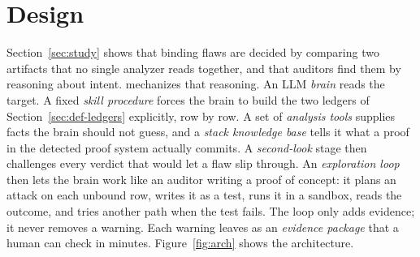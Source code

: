 \section{\tool{} Design}\label{sec:design}

Section~\ref{sec:study} shows that binding flaws are decided by comparing
two artifacts that no single analyzer reads together, and that auditors find
them by reasoning about intent. \tool{} mechanizes that reasoning. An LLM
\emph{brain} reads the target. A fixed \emph{skill procedure} forces the brain
to build the two ledgers of Section~\ref{sec:def-ledgers} explicitly, row by
row. A set of \emph{analysis tools} supplies facts the brain should not guess,
and a \emph{stack knowledge base} tells it what a proof in the detected proof
system actually commits. A \emph{second-look} stage then challenges every
verdict that would let a flaw slip through.
An \emph{exploration loop} then lets the brain work like an auditor writing a
proof of concept: it plans an attack on each unbound row, writes it as a test,
runs it in a sandbox, reads the outcome, and tries another path when the test
fails. The loop only adds evidence; it never removes a warning. Each warning
leaves \tool{} as an \emph{evidence package} that a human can check in
minutes. Figure~\ref{fig:arch} shows the architecture.

